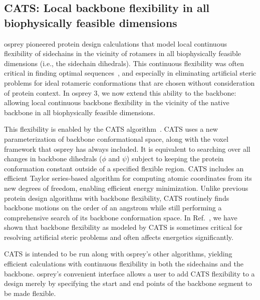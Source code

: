 \subsection{CATS: Local backbone flexibility in all biophysically feasible dimensions}

{\sc osprey} pioneered protein design calculations that model local continuous flexibility of sidechains in the vicinity of rotamers in all biophysically feasible dimensions (i.e., the sidechain dihedrals).  This continuous flexibility was often critical in finding optimal sequences~\cite{iMinDEE}, and especially in eliminating artificial steric problems for ideal rotameric conformations that are chosen without consideration of protein context.  In {\sc osprey} 3, we now extend this ability to the backbone: allowing local continuous backbone flexibility in the vicinity of the native backbone in all biophysically feasible dimensions.  

This flexibility is enabled by the CATS algorithm~\cite{CATS}.  CATS uses a new parameterization of backbone conformational space, along with the voxel framework that {\sc osprey} has always included.  It is equivalent to searching over all changes in backbone dihedrals ($\phi$ and $\psi$) subject to keeping the protein conformation constant outside of a specified flexible region. CATS includes an efficient Taylor series-based algorithm for computing atomic coordinates from its new degrees of freedom, enabling efficient energy minimization.  Unlike previous protein design algorithms with backbone flexibility, CATS routinely finds backbone motions on the order of an angstrom while still performing a comprehensive search of its backbone conformation space.  In Ref.~, we have shown that backbone flexibility as modeled by CATS is sometimes critical for resolving artificial steric problems and often affects energetics significantly.  

CATS is intended to be run along with {\sc osprey}'s other algorithms, yielding efficient calculations with continuous flexibility in both the sidechains and the backbone. {\sc osprey}'s convenient interface allows a user to add CATS flexibility to a design merely by specifying the start and end points of the backbone segment to be made flexible.  